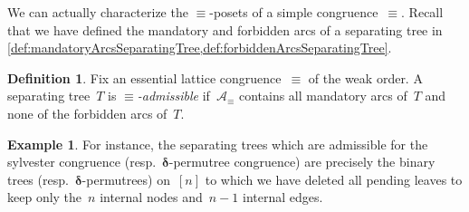 \documentclass{amsart}
\theoremstyle{definition}
\newtheorem{definition}[theorem]{Definition}
\newtheorem{example}[theorem]{Example}
\renewcommand{\b}[1]{{\boldsymbol{#1}}} %
\newcommand{\darkblue}{\color{darkblue}} %
\newcommand{\defn}[1]{\textsl{\darkblue #1}} %
\newcommand{\arcs}{{\mathcal{A}}} %
\newcommand{\decoration}{{\b{\delta}}} %
\begin{document}
We can actually characterize the $\equiv$-posets of a simple congruence~$\equiv$.
Recall that we have defined the mandatory and forbidden arcs of a separating tree in \cref{def:mandatoryArcsSeparatingTree,def:forbiddenArcsSeparatingTree}.

%

\begin{definition}
\label{def:admissibleSeparatingTrees}
Fix an essential lattice congruence~$\equiv$ of the weak order.
A separating tree~$T$ is \defn{$\equiv$-admissible} if~$\arcs_\equiv$ contains all mandatory arcs of~$T$ and none of the forbidden arcs of~$T$.
\end{definition}

\begin{example}
For instance, the separating trees which are admissible for the sylvester congruence (resp.~$\decoration$-permutree congruence) are precisely the binary trees (resp.~$\decoration$-permutrees) on~$[n]$ to which we have deleted all pending leaves to keep only the~$n$ internal nodes and~$n-1$ internal edges.
\end{example}
\end{document}
